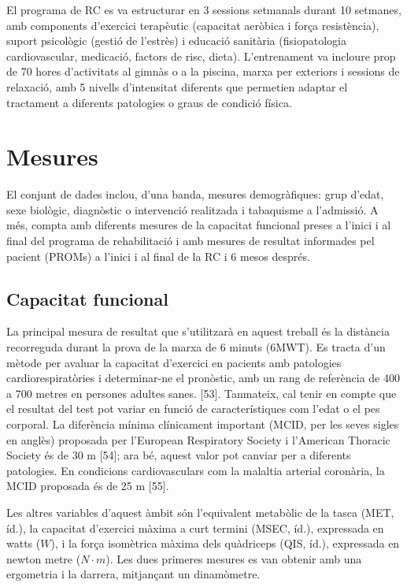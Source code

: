 \documentclass[CAT]{TFUOC}%
\begin{document}
El programa de RC es va estructurar en 3 sessions setmanals durant 10 setmanes, amb components d'exercici terapèutic (capacitat aeròbica i força resistència), suport psicològic (gestió de l'estrès) i educació sanitària (fisiopatologia cardiovascular, medicació, factors de risc, dieta). L'entrenament va incloure prop de 70 hores d'activitats al gimnàs o a la piscina, marxa per exteriors i sessions de relaxació, amb 5 nivells d'intensitat diferents que permetien adaptar el tractament a diferents patologies o graus de condició física.

\section{Mesures}\label{mesures}

El conjunt de dades inclou, d'una banda, mesures demogràfiques: grup d'edat, sexe biològic, diagnòstic o intervenció realitzada i tabaquisme a l'admissió. A més, compta amb diferents mesures de la capacitat funcional preses a l'inici i al final del programa de rehabilitació i amb mesures de resultat informades pel pacient (PROMs) a l'inici i al final de la RC i 6 mesos després.

\subsection{Capacitat funcional}\label{capacitat-funcional}

La principal mesura de resultat que s'utilitzarà en aquest treball és la distància recorreguda durant la prova de la marxa de 6 minuts (6MWT). Es tracta d'un mètode per avaluar la capacitat d'exercici en pacients amb patologies cardiorespiratòries i determinar-ne el pronòstic, amb un rang de referència de 400 a 700 metres en persones adultes sanes. {[}53{]}. Tanmateix, cal tenir en compte que el resultat del test pot variar en funció de característiques com l'edat o el pes corporal. La diferència mínima clínicament important (MCID, per les seves sigles en anglès) proposada per l'European Respiratory Society i l'American Thoracic Society és de 30 m {[}54{]}; ara bé, aquest valor pot canviar per a diferents patologies. En condicions cardiovasculars com la malaltia arterial coronària, la MCID proposada és de 25 m {[}55{]}.

Les altres variables d'aquest àmbit són l'equivalent metabòlic de la tasca (MET, íd.), la capacitat d'exercici màxima a curt termini (MSEC, íd.), expressada en watts (\(W\)), i la força isomètrica màxima dels quàdriceps (QIS, íd.), expressada en newton metre (\(N \cdot m\)). Les dues primeres mesures es van obtenir amb una ergometria i la darrera, mitjançant un dinamòmetre.
\end{document}
